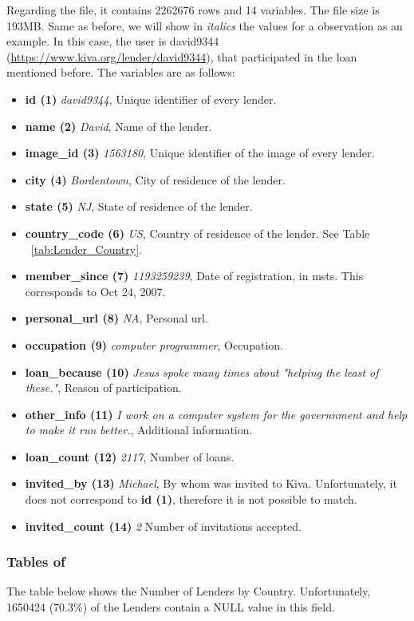 Regarding the  file, it contains 2262676 rows and 14 variables. The file size is 193MB. Same as before, we will show in \textit{italics} the values for a observation as an example. In this case, the user is david9344 (\url{https://www.kiva.org/lender/david9344}), that participated in the loan mentioned before. The variables are as follows:

\begin{itemize}
\item \textbf{id (1)} \textit{david9344}, Unique identifier of every lender.
\item \textbf{name (2)} \textit{David}, Name of the lender.
\item \textbf{image\_id (3)} \textit{1563180}, Unique identifier of the image of every lender.
\item \textbf{city (4)} \textit{Bordentown}, City of residence of the lender.
\item \textbf{state (5)} \textit{NJ}, State of residence of the lender.
\item \textbf{country\_code (6)} \textit{US}, Country of residence of the lender. See Table ~\ref{tab:Lender_Country}.
\item \textbf{member\_since (7)} \textit{1193259239}, Date of registration, in msts. This corresponds to Oct 24, 2007.
\item \textbf{personal\_url (8)} \textit{NA}, Personal url.
\item \textbf{occupation (9)} \textit{computer programmer}, Occupation.
\item \textbf{loan\_because (10)} \textit{Jesus spoke many times about "helping the least of these."}, Reason of participation.
\item \textbf{other\_info (11)} \textit{I work on a computer system for the governnment and help to make it run better.}, Additional information.
\item \textbf{loan\_count (12)} \textit{2117}, Number of loans.
\item \textbf{invited\_by (13)} \textit{Michael}, By whom was invited to Kiva. Unfortunately, it does not correspond to \textbf{id (1)}, therefore it is not possible to match.
\item \textbf{invited\_count (14)} \textit{2} Number of invitations accepted.
\end{itemize}

\subsubsection{Tables of }
The table below shows the Number of Lenders by Country. Unfortunately, 1650424 (70.3\%) of the Lenders contain a NULL value in this field. 


